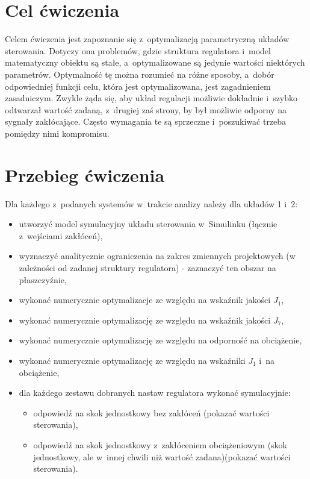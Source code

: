 \documentclass{sprawozdanie-agh}
\begin{document}

\stronatytulowa{}
\section{Cel ćwiczenia}
Celem ćwiczenia jest zapoznanie się z~optymalizacją parametryczną układów sterowania.
Dotyczy ona problemów, gdzie struktura regulatora i~model matematyczny obiektu są stałe, a~optymalizowane są jedynie wartości niektórych parametrów.
Optymalność tę można rozumieć na różne sposoby, a~dobór odpowiedniej funkcji celu, która jest optymalizowana, jest zagadnieniem zasadniczym.
Zwykle żąda się, aby układ regulacji możliwie dokładnie i~szybko odtwarzał wartość zadaną, z~drugiej zaś strony, by był możliwie odporny na sygnały zakłócające.
Często wymagania te są sprzeczne i~poszukiwać trzeba pomiędzy nimi kompromisu.

\section{Przebieg ćwiczenia}
Dla każdego z~podanych systemów w~trakcie analizy należy dla układów 1 i~2:
\begin{itemize}
    \item utworzyć model symulacyjny układu sterowania w~Simulinku (łącznie z~wejściami zakłóceń),
    \item wyznaczyć analitycznie ograniczenia na zakres zmiennych projektowych (w zależności od zadanej struktury regulatora) - zaznaczyć ten obszar na płaszczyźnie,
    \item wykonać numerycznie optymalizacje ze względu na wskaźnik jakości $J_{1}$,
    \item wykonać numerycznie optymalizację ze względu na wskaźnik jakości $J_{7}$,
    \item wykonać numerycznie optymalizację ze względu na odporność na obciążenie,
    \item wykonać numerycznie optymalizację ze względu na wskaźniki $J_{1}$  i~na obciążenie,
    \item dla każdego zestawu dobranych nastaw regulatora wykonać symulacyjnie:
        \begin{itemize}
            \item odpowiedź na skok jednostkowy bez zakłóceń (pokazać wartości sterowania),
            \item odpowiedź na skok jednostkowy z~zakłóceniem obciążeniowym (skok jednostkowy, ale w~innej chwili niż wartość zadana)(pokazać wartości sterowania).
        \end{itemize}
\end{itemize}
\end{document}
